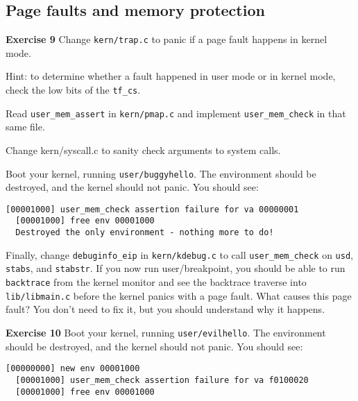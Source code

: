 \documentclass[11pt]{article}
\begin{document}
\subsection{Page faults and memory protection}
\begin{framed}
\noindent\textbf{Exercise 9} Change \lstinline|kern/trap.c| to panic if a page fault happens in kernel mode.

Hint: to determine whether a fault happened in user mode or in kernel mode, check the low bits of the \lstinline|tf_cs|.

Read \lstinline|user_mem_assert| in \lstinline|kern/pmap.c| and implement \lstinline|user_mem_check| in that same file.

Change kern/syscall.c to sanity check arguments to system calls.

Boot your kernel, running \lstinline|user/buggyhello|. The environment should be destroyed, and the kernel should not panic. You should see:

\begin{lstlisting}[aboveskip=-1.5em,frame=none]
  [00001000] user_mem_check assertion failure for va 00000001
  [00001000] free env 00001000
  Destroyed the only environment - nothing more to do!
\end{lstlisting}

Finally, change \lstinline|debuginfo_eip| in \lstinline|kern/kdebug.c| to call \lstinline|user_mem_check| on \lstinline|usd|, \lstinline|stabs|, and \lstinline|stabstr|. If you now run user/breakpoint, you should be able to run \lstinline|backtrace| from the kernel monitor and see the backtrace traverse into \lstinline|lib/libmain.c| before the kernel panics with a page fault. What causes this page fault? You don't need to fix it, but you should understand why it happens.

\end{framed}

\begin{framed}
\noindent\textbf{Exercise 10}
  Boot your kernel, running \lstinline|user/evilhello|. The environment should be destroyed, and the kernel should not panic. You should see:

\begin{lstlisting}[aboveskip=-1.5em,frame=none]
  [00000000] new env 00001000
  [00001000] user_mem_check assertion failure for va f0100020
  [00001000] free env 00001000
\end{lstlisting}
  
\end{framed}
\end{document}
